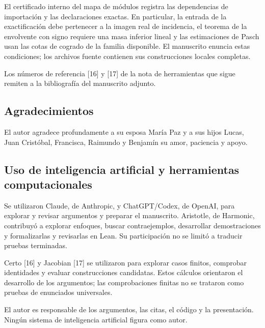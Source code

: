 \documentclass[spanish,11pt,a4paper]{article}
\begin{document}
El certificado interno del mapa de módulos registra las dependencias de importación y las declaraciones exactas. En particular, la entrada de la exactificación debe pertenecer a la imagen real de incidencia, el teorema de la envolvente con signo requiere una masa inferior lineal y las estimaciones de Pasch usan las cotas de cogrado de la familia disponible. El manuscrito enuncia estas condiciones; los archivos fuente contienen sus construcciones locales completas.

Los números de referencia {[}16{]} y {[}17{]} de la nota de herramientas que sigue remiten a la bibliografía del manuscrito adjunto.

\subsection{Agradecimientos}\label{agradecimientos}

El autor agradece profundamente a su esposa María Paz y a sus hijos Lucas, Juan Cristóbal, Francisca, Raimundo y Benjamín su amor, paciencia y apoyo.

\subsection{Uso de inteligencia artificial y herramientas computacionales}\label{uso-de-inteligencia-artificial-y-herramientas-computacionales}

Se utilizaron Claude, de Anthropic, y ChatGPT/Codex, de OpenAI, para explorar y revisar argumentos y preparar el manuscrito. Aristotle, de Harmonic, contribuyó a explorar enfoques, buscar contraejemplos, desarrollar demostraciones y formalizarlas y revisarlas en Lean. Su participación no se limitó a traducir pruebas terminadas.

Certo {[}16{]} y Jacobian {[}17{]} se utilizaron para explorar casos finitos, comprobar identidades y evaluar construcciones candidatas. Estos cálculos orientaron el desarrollo de los argumentos; las comprobaciones finitas no se trataron como pruebas de enunciados universales.

El autor es responsable de los argumentos, las citas, el código y la presentación. Ningún sistema de inteligencia artificial figura como autor.
\end{document}
